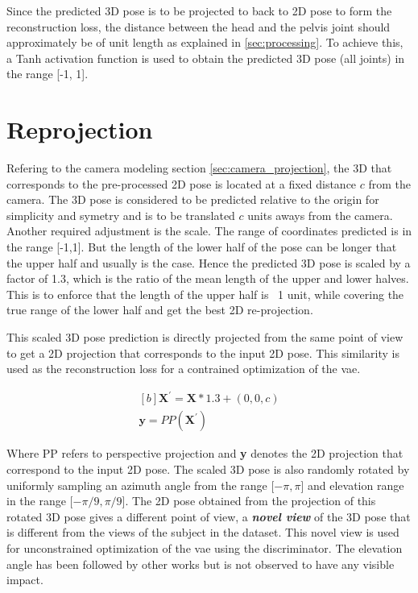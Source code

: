 Since the predicted 3D pose is to be projected to back to 2D pose to form the reconstruction loss, the distance between the head and the pelvis joint should approximately be of unit length as explained in \ref{sec:processing}. To achieve this, a Tanh activation function is used to obtain the predicted 3D pose (all joints) in the range [-1, 1]. %

\section{Reprojection}
Refering to the camera modeling section \ref{sec:camera_projection}, the 3D that corresponds to the pre-processed 2D pose is located at a fixed distance $c$ from the camera. The 3D pose is considered to be predicted relative to the origin for simplicity and symetry and is to be translated $c$ units aways from the camera. Another required adjustment is the scale. The range of coordinates predicted is in the range [-1,1]. But the length of the lower half of the pose can be longer that the upper half and usually is the case. Hence the predicted 3D pose is scaled by a factor of 1.3, which is the ratio of the mean length of the upper and lower halves. This is to enforce that the length of the upper half is ~1 unit, while covering the true range of the lower half and get the best 2D re-projection.

This scaled 3D pose prediction is directly projected from the same point of view to get a 2D projection that corresponds to the input 2D pose. This similarity is used as the reconstruction loss for a contrained optimization of the \ac{vae}.

\begin{equation} \label{eqn:proj_direct}
    \begin{gathered}[b]
        \textbf{X}^\prime = \textbf{X}*1.3 + (0,0,c) \\
        \textbf{y} = PP(\textbf{X}^\prime)
    \end{gathered}
\end{equation}

Where PP refers to perspective projection and \textbf{y} denotes the 2D projection that correspond to the input 2D pose. The scaled 3D pose is also randomly rotated by uniformly sampling an azimuth angle from the range [$-\pi, \pi$] and elevation range in the range [$-\pi/9, \pi/9$]. The 2D pose obtained from the projection of this rotated 3D pose gives a different point of view, a \textbf{\textit{novel view}} of the 3D pose that is different from the views of the subject in the dataset. This novel view is used for unconstrained optimization of the \ac{vae} using the discriminator. The elevation angle has been followed by other works but is not observed to have any visible impact.

